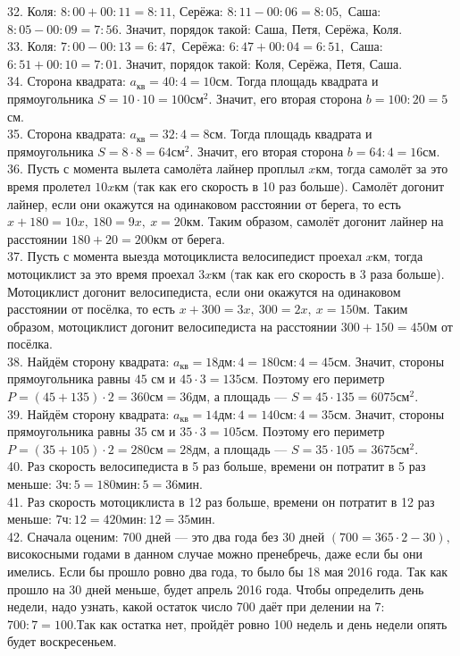 32. Коля: $8:00+00:11=8:11$, Серёжа: $8:11-00:06=8:05,$ Саша: $8:05-00:09=7:56.$ Значит, порядок такой: Саша, Петя, Серёжа, Коля.\\
33. Коля: $7:00-00:13=6:47,$ Серёжа: $6:47+00:04=6:51,$ Саша: $6:51+00:10=7:01.$ Значит, порядок такой: Коля, Серёжа, Петя, Саша.\\
34. Сторона квадрата: $a_{\text{кв}}=40:4=10$см. Тогда площадь квадрата и прямоугольника $S=10\cdot10=100\text{см}^2.$ Значит, его вторая сторона $b=100:20=5$см.\\
35. Сторона квадрата: $a_{\text{кв}}=32:4=8$см. Тогда площадь квадрата и прямоугольника $S=8\cdot8=64\text{см}^2.$ Значит, его вторая сторона $b=64:4=16$см.\\
36. Пусть с момента вылета самолёта лайнер проплыл $x$км, тогда самолёт за это время пролетел $10x$км (так как его скорость в 10 раз больше). Самолёт догонит лайнер, если они окажутся на одинаковом расстоянии от берега, то есть $x+180=10x,\ 180=9x,\ x=20$км. Таким образом, самолёт догонит лайнер на расстоянии $180+20=200$км от берега.\\
37. Пусть с момента выезда мотоциклиста велосипедист проехал $x$км, тогда мотоциклист за это время проехал $3x$км (так как его скорость в 3 раза больше). Мотоциклист догонит велосипедиста, если они окажутся на одинаковом расстоянии от посёлка, то есть $x+300=3x,\ 300=2x,\ x=150$м. Таким образом, мотоциклист догонит велосипедиста на расстоянии $300+150=450$м от посёлка.\\
38. Найдём сторону квадрата: $a_{\text{кв}}=18\text{дм}:4=180\text{см}:4=45$см. Значит, стороны прямоугольника равны $45$ см и $45\cdot3=135$см. Поэтому его периметр $P=(45+135)\cdot2=360\text{см}=36$дм, а площадь --- $S=45\cdot135=6075\text{см}^2.$\\
39. Найдём сторону квадрата: $a_{\text{кв}}=14\text{дм}:4=140\text{см}:4=35$см. Значит, стороны прямоугольника равны $35$ см и $35\cdot3=105$см. Поэтому его периметр $P=(35+105)\cdot2=280\text{см}=28$дм, а площадь --- $S=35\cdot105=3675\text{см}^2.$\\
40. Раз скорость велосипедиста в 5 раз больше, времени он потратит в 5 раз меньше: $3\text{ч}:5=180\text{мин}:5=36$мин.\\
41. Раз скорость мотоциклиста в 12 раз больше, времени он потратит в 12 раз меньше: $7\text{ч}:12=420\text{мин}:12=35$мин.\\
42. Сначала оценим: 700 дней --- это два года без 30 дней $(700=365\cdot2-30),$ високосными годами в данном случае можно пренебречь, даже если бы они имелись. Если бы прошло ровно два года, то было бы 18 мая 2016 года. Так как прошло на 30 дней меньше, будет апрель 2016 года. Чтобы определить день недели, надо узнать, какой остаток число 700 даёт при делении на 7: $700:7=100.$Так как остатка нет, пройдёт ровно 100 недель и день недели опять будет воскресеньем.\\
